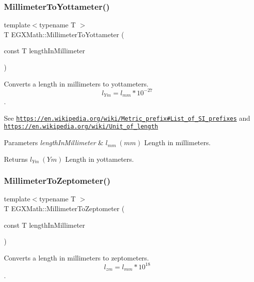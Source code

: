 \subsubsection{\texorpdfstring{Millimeter\+To\+Yottameter()}{MillimeterToYottameter()}}
{\footnotesize\ttfamily template$<$typename T $>$ \\
T E\+G\+X\+Math\+::\+Millimeter\+To\+Yottameter (\begin{DoxyParamCaption}\item[{const T}]{length\+In\+Millimeter }\end{DoxyParamCaption})}



Converts a length in millimeters to yottameters. \[ l_{Ym}=l_{mm} * 10^{-27} \]. 

See \href{https://en.wikipedia.org/wiki/Metric_prefix#List_of_SI_prefixes}{\tt https\+://en.\+wikipedia.\+org/wiki/\+Metric\+\_\+prefix\#\+List\+\_\+of\+\_\+\+S\+I\+\_\+prefixes} and \href{https://en.wikipedia.org/wiki/Unit_of_length}{\tt https\+://en.\+wikipedia.\+org/wiki/\+Unit\+\_\+of\+\_\+length} 
\begin{DoxyParams}{Parameters}
{\em length\+In\+Millimeter} & $ l_{mm}\ (mm)$ Length in millimeters. \\
\hline
\end{DoxyParams}
\begin{DoxyReturn}{Returns}
$ l_{Ym}\ (Ym)$ Length in yottameters. 
\end{DoxyReturn}
\mbox{\label{group___e_g_x_math-_conversions-_length_conversions-_s_i-_millimeter-_s_i_ga7973ce559c88b84035d9653e26e4464c}} 
\subsubsection{\texorpdfstring{Millimeter\+To\+Zeptometer()}{MillimeterToZeptometer()}}
{\footnotesize\ttfamily template$<$typename T $>$ \\
T E\+G\+X\+Math\+::\+Millimeter\+To\+Zeptometer (\begin{DoxyParamCaption}\item[{const T}]{length\+In\+Millimeter }\end{DoxyParamCaption})}



Converts a length in millimeters to zeptometers. \[ l_{zm}=l_{mm} * 10^{18} \]. 

